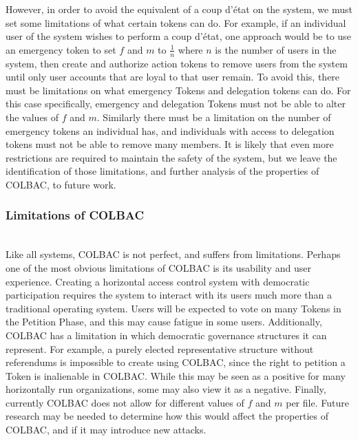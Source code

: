However, in order to avoid the equivalent of a coup d'\'etat on the system, we
must set some limitations of what certain tokens can do. For example, if an 
individual user of the system wishes to perform a coup d'\'etat, one approach
would be to use an emergency token to set $f$ and $m$ to $\frac{1}{n}$ where $n$
is the number of users in the system, then create and authorize action tokens to
remove users from the system until only user accounts that are loyal to that
user remain. To avoid this, there must be limitations on what emergency Tokens
and delegation tokens can do. For this case specifically, emergency and
delegation Tokens must not be able to alter the values of $f$ and $m$. Similarly
there must be a limitation on the number of emergency tokens an individual has,
and individuals with access to delegation tokens must not be able to remove many
members. It is likely that even more restrictions are required to maintain the
safety of the system, but we leave the identification of those limitations, and
further analysis of the properties of COLBAC, to future work.

\subsubsection{Limitations of COLBAC}
\mbox{}\\
Like all systems, COLBAC is not perfect, and suffers from limitations. Perhaps
one of the most obvious limitations of COLBAC is its usability and user
experience. Creating a horizontal access control system with democratic
participation requires the system to interact with its users much more than a
traditional operating system. Users will be expected to vote on many Tokens in
the Petition Phase, and this may cause fatigue in some users. Additionally, 
COLBAC has a limitation in which democratic governance structures it can
represent. For example, a purely elected representative structure without
referendums is impossible to create using COLBAC, since the right to petition
a Token is inalienable in COLBAC. While this may be seen as a positive for many
horizontally run organizations, some may also view it as a negative. Finally,
currently COLBAC does not allow for different values of $f$ and $m$ per file.
Future research may be needed to determine how this would affect the properties
of COLBAC, and if it may introduce new attacks.
